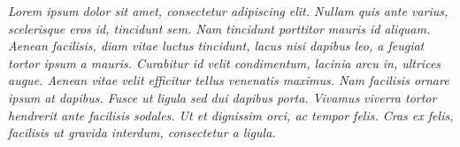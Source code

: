 \begin{newpage}
  \vspace*{\fill} %
	\thispagestyle{empty}
	\setlength{\baselineskip}{1.5\baselineskip} %
	\begin{flushright}
		\begin{minipage}{12cm} 
      \textit{
		Lorem ipsum dolor sit amet, consectetur adipiscing elit. Nullam quis ante varius, scelerisque eros id, tincidunt sem. Nam tincidunt porttitor mauris id aliquam. Aenean facilisis, diam vitae luctus tincidunt, lacus nisi dapibus leo, a feugiat tortor ipsum a mauris. Curabitur id velit condimentum, lacinia arcu in, ultrices augue. Aenean vitae velit efficitur tellus venenatis maximus. Nam facilisis ornare ipsum at dapibus. Fusce ut ligula sed dui dapibus porta. Vivamus viverra tortor hendrerit ante facilisis sodales. Ut et dignissim orci, ac tempor felis. Cras ex felis, facilisis ut gravida interdum, consectetur a ligula. 
      }
		\end{minipage}
	\end{flushright}
\end{newpage}
\clearpage
